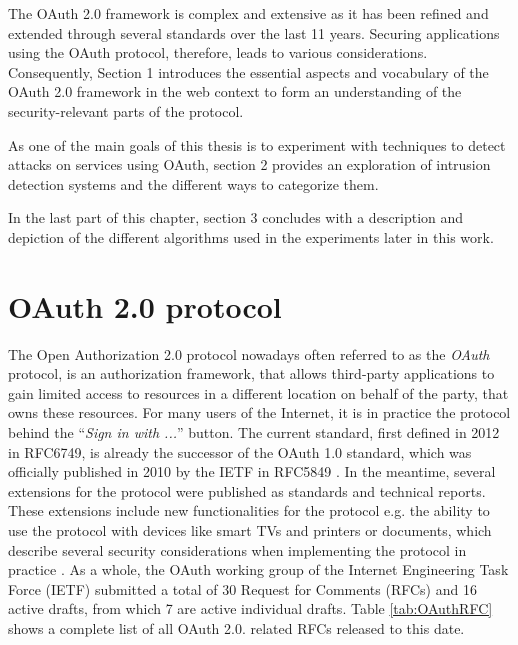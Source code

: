 The OAuth 2.0 framework is complex and extensive as it has been refined and extended through several standards over the last 11 years. Securing applications using the OAuth protocol, therefore, leads to various considerations. Consequently, Section 1 introduces the essential aspects and vocabulary of the OAuth 2.0 framework in the web context to form an understanding of the security-relevant parts of the protocol.

As one of the main goals of this thesis is to experiment with techniques to detect attacks on services using OAuth, section 2 provides an exploration of intrusion detection systems and the different ways to categorize them.

In the last part of this chapter, section 3 concludes with a description and depiction of the different algorithms used in the experiments later in this work.

\section{OAuth 2.0 protocol}
The Open Authorization 2.0 protocol nowadays often referred to as the
\emph{OAuth} protocol, is an authorization framework, that allows third-party
applications to gain limited access to resources in a different location on
behalf of the party, that owns these resources. For many users of the Internet,
it is in practice the protocol behind the ``\emph{Sign in with ...}'' button.
The current standard, first defined in 2012 in RFC6749, is already the
successor of the OAuth 1.0 standard, which was officially published in 2010 by
the IETF in RFC5849 \cite{hammer2010rfc}. In the meantime, several extensions
for the protocol were published as standards and technical reports. These
extensions include new functionalities for the protocol e.g. the ability to use
the protocol with devices like smart TVs and printers \cite{denniss2019oauth}
or documents, which describe several security considerations when implementing
the protocol in practice \cite{lodderstedt2020oauth}. As a whole, the OAuth
working group of the Internet Engineering Task Force (IETF) submitted a total
of 30 Request for Comments (RFCs) and 16 active drafts, from which 7 are active
individual drafts. Table \ref{tab:OAuthRFC} shows a complete list of all OAuth 2.0. related RFCs released to this date. 


